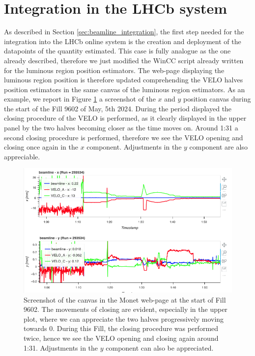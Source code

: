
\section{Integration in the LHCb system}\label{sec:integration_detector}
As described in Section \ref{sec:beamline_integration}, the first step needed for the integration into the LHCb online system is the creation and deployment of the datapoints of the quantity estimated. This case is fully analogue as the one already described, therefore we just modified the WinCC script already written for the luminous region position estimators. The web-page displaying the luminous region position is therefore updated comprehending the VELO halves position estimators in the same canvas of the luminous region estimators. As an example, we report in Figure \ref{fig:VELO_closing_xy} a screenshot of the $x$ and $y$ position canvas during the start of the Fill 9602 of May, 5th 2024. During the period displayed the closing procedure of the VELO is performed, as it clearly displayed in the upper panel by the two halves becoming closer as the time moves on. Around 1:31 a second closing procedure is performed, therefore we see the VELO opening and closing once again in the $x$ component. Adjustments in the $y$ component are also appreciable.
\begin{figure}
    \centering
    \includegraphics[width=\textwidth]{figures/VELO_closing_xy.png}
    \caption{Screenshot of the canvas in the Monet web-page at the start of Fill 9602. The movements of closing are evident, especially in the upper plot, where we can appreciate the two halves progressively moving towards 0. During this Fill, the closing procedure was performed twice, hence we see the VELO opening and closing again around 1:31. Adjustments in the $y$ component can also be appreciated.} 
    \label{fig:VELO_closing_xy}
\end{figure}

